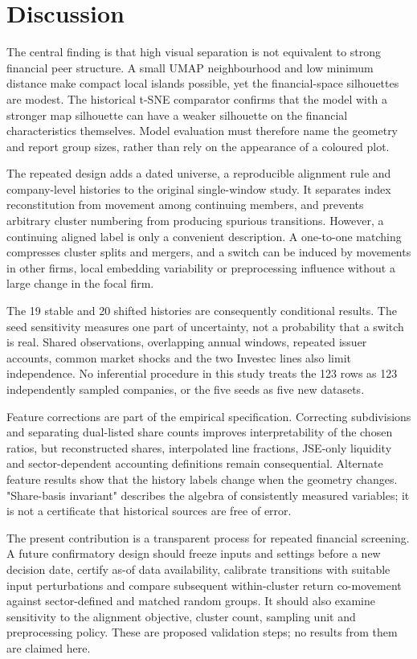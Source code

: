 \FloatBarrier
\section{Discussion}

The central finding is that high visual separation is not equivalent to strong financial peer structure. A small UMAP neighbourhood and low minimum distance make compact local islands possible, yet the financial-space silhouettes are modest. The historical t-SNE comparator confirms that the model with a stronger map silhouette can have a weaker silhouette on the financial characteristics themselves. Model evaluation must therefore name the geometry and report group sizes, rather than rely on the appearance of a coloured plot.


The repeated design adds a dated universe, a reproducible alignment rule and company-level histories to the original single-window study. It separates index reconstitution from movement among continuing members, and prevents arbitrary cluster numbering from producing spurious transitions. However, a continuing aligned label is only a convenient description. A one-to-one matching compresses cluster splits and mergers, and a switch can be induced by movements in other firms, local embedding variability or preprocessing influence without a large change in the focal firm.


The 19 stable and 20 shifted histories are consequently conditional results. The seed sensitivity measures one part of uncertainty, not a probability that a switch is real. Shared observations, overlapping annual windows, repeated issuer accounts, common market shocks and the two Investec lines also limit independence. No inferential procedure in this study treats the 123 rows as 123 independently sampled companies, or the five seeds as five new datasets.


Feature corrections are part of the empirical specification. Correcting subdivisions and separating dual-listed share counts improves interpretability of the chosen ratios, but reconstructed shares, interpolated line fractions, JSE-only liquidity and sector-dependent accounting definitions remain consequential. Alternate feature results show that the history labels change when the geometry changes. "Share-basis invariant" describes the algebra of consistently measured variables; it is not a certificate that historical sources are free of error.


The present contribution is a transparent process for repeated financial screening. A future confirmatory design should freeze inputs and settings before a new decision date, certify as-of data availability, calibrate transitions with suitable input perturbations and compare subsequent within-cluster return co-movement against sector-defined and matched random groups. It should also examine sensitivity to the alignment objective, cluster count, sampling unit and preprocessing policy. These are proposed validation steps; no results from them are claimed here.



